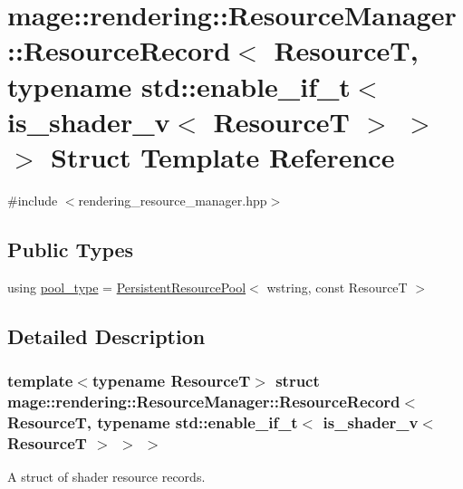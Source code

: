 \hypertarget{structmage_1_1rendering_1_1_resource_manager_1_1_resource_record_3_01_resource_t_00_01typename_09b062ee4b0394619806084252c69f48d}{}\section{mage\+:\+:rendering\+:\+:Resource\+Manager\+:\+:Resource\+Record$<$ ResourceT, typename std\+:\+:enable\+\_\+if\+\_\+t$<$ is\+\_\+shader\+\_\+v$<$ ResourceT $>$ $>$ $>$ Struct Template Reference}
\label{structmage_1_1rendering_1_1_resource_manager_1_1_resource_record_3_01_resource_t_00_01typename_09b062ee4b0394619806084252c69f48d}


{\ttfamily \#include $<$rendering\+\_\+resource\+\_\+manager.\+hpp$>$}

\subsection*{Public Types}
\begin{DoxyCompactItemize}
\item 
using \mbox{\hyperlink{structmage_1_1rendering_1_1_resource_manager_1_1_resource_record_3_01_resource_t_00_01typename_09b062ee4b0394619806084252c69f48d_a5f755d5452be9da7f699b8545a97337f}{pool\+\_\+type}} = \mbox{\hyperlink{classmage_1_1_persistent_resource_pool}{Persistent\+Resource\+Pool}}$<$ wstring, const ResourceT $>$
\end{DoxyCompactItemize}


\subsection{Detailed Description}
\subsubsection*{template$<$typename ResourceT$>$\newline
struct mage\+::rendering\+::\+Resource\+Manager\+::\+Resource\+Record$<$ Resource\+T, typename std\+::enable\+\_\+if\+\_\+t$<$ is\+\_\+shader\+\_\+v$<$ Resource\+T $>$ $>$ $>$}

A struct of shader resource records.


